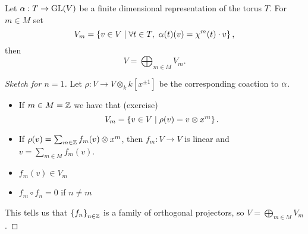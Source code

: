 \begin{proposition}\label{PrRepresentationsOfToriSplit}
Let $\alpha:T\to \mathrm{GL}(V)$ be a finite dimensional representation of the torus $T$. For $m\in M$ set
\[V_m=\cpa{v\in V\mid \forall t\in T,\ \al(t)(v)={\chi^m(t)}\cdot v},\]
then
\[V=\bigoplus_{m\in M}V_m.\]
\end{proposition}
\begin{proof}[Sketch for $n=1$]
Let $\rho:V\to V\otimes_k k[x^{\pm1}]$ be the corresponding coaction to $\alpha$.
\begin{itemize}
\item If $m\in M=\mathbb{Z}$ we have that (exercise)
\[V_m=\left\{{v\in V\mid \rho(v)=v\otimes x^m}\right\}.\]
\item If $\rho(v)=\sum_{m\in \mathbb{Z}} f_m(v)\otimes x^m$, then $f_m:V\to V$ is linear and $v=\sum_{m\in M}f_m(v)$.
\item $f_m(v)\in V_m$
\item $f_m\circ f_n=0$ if $n\neq m$
\end{itemize}
This tells us that $\left\{{f_n}\right\}_{n\in\mathbb{Z}}$ is a family of orthogonal projectors, so $V=\bigoplus_{m\in M}V_m$.
\end{proof}





















